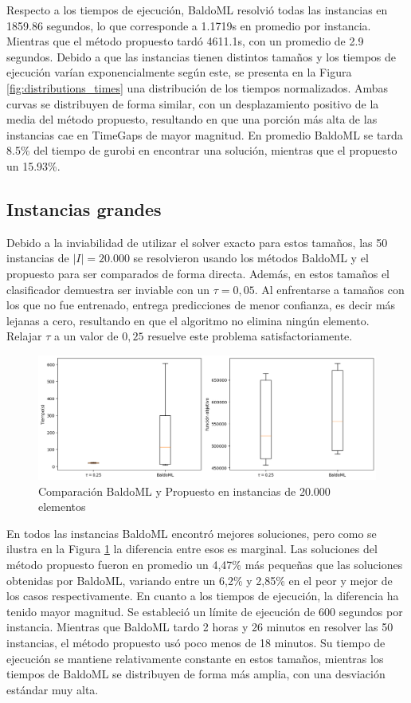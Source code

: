 \documentclass[spanish, a4paper, 12pt, openany,final]{book}
\begin{document}
Respecto a los tiempos de ejecución, BaldoML resolvió todas las instancias en 1859.86 segundos, lo que corresponde a 1.1719s en promedio por instancia. Mientras que el método propuesto tardó 4611.1s, con un promedio de 2.9 segundos. Debido a que las instancias tienen distintos tamaños y los tiempos de ejecución varían exponencialmente según este, se presenta en la Figura \ref{fig:distributions_times} una distribución de los tiempos normalizados. Ambas curvas se distribuyen de forma similar, con un desplazamiento positivo de la media del método propuesto, resultando en que una porción más alta de las instancias cae en TimeGaps de mayor magnitud. En promedio BaldoML se tarda 8.5\% del tiempo de gurobi en encontrar una solución, mientras que el propuesto un 15.93\%.



\subsection*{Instancias grandes}


Debido a la inviabilidad de utilizar el solver exacto para estos tamaños, las 50 instancias de $|I| = 20.000$ se resolvieron usando los métodos BaldoML y el propuesto para ser comparados de forma directa. Además, en estos tamaños el clasificador demuestra ser inviable con un $\tau = 0,05$. Al enfrentarse a tamaños con los que no fue entrenado, entrega predicciones de menor confianza, es decir más lejanas a cero, resultando en que el algoritmo no elimina ningún elemento. Relajar $\tau$ a un valor de $0,25$ resuelve este problema satisfactoriamente.

\begin{figure}[H]
	\includegraphics[scale=0.5]{graphs/comparison.png}	
	\caption{Comparación BaldoML y Propuesto en instancias de 20.000 elementos}
	\label{fig:comparison}
\end{figure}

En todos las instancias BaldoML encontró mejores soluciones, pero como se ilustra en la Figura \ref{fig:comparison} la diferencia entre esos es marginal. Las soluciones del método propuesto fueron en promedio un 4,47\% más pequeñas que las soluciones obtenidas por BaldoML, variando entre un 6,2\% y 2,85\% en el peor y mejor de los casos respectivamente. En cuanto a los tiempos de ejecución, la diferencia ha tenido mayor magnitud. Se estableció un límite de ejecución de 600 segundos por instancia. Mientras que BaldoML tardo 2 horas y 26  minutos en resolver las 50 instancias, el método propuesto usó poco menos de 18 minutos. Su tiempo de ejecución se mantiene relativamente constante en estos tamaños, mientras los tiempos de BaldoML se distribuyen de forma más amplia, con una desviación estándar muy alta.
\end{document}
